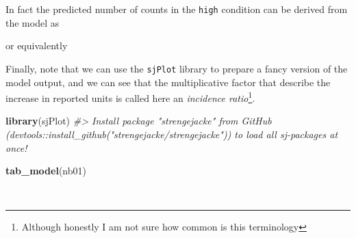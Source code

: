 \documentclass[
]{book}
\newenvironment{Shaded}{\begin{snugshade}}{\end{snugshade}}
\newcommand{\CommentTok}[1]{\textcolor[rgb]{0.56,0.35,0.01}{\textit{#1}}}
\newcommand{\FunctionTok}[1]{\textcolor[rgb]{0.13,0.29,0.53}{\textbf{#1}}}
\newcommand{\NormalTok}[1]{#1}
\newcommand{\SpecialCharTok}[1]{\textcolor[rgb]{0.81,0.36,0.00}{\textbf{#1}}}
\newcommand{\StringTok}[1]{\textcolor[rgb]{0.31,0.60,0.02}{#1}}
\begin{document}
In fact the predicted number of counts in the \texttt{high} condition can be derived from the model as

\begin{Shaded}
\end{Shaded}

or equivalently

\begin{Shaded}
\end{Shaded}

Finally, note that we can use the \texttt{sjPlot} library to prepare a fancy version of the model output, and we can see that the multiplicative factor that describe the increase in reported units is called here an \emph{incidence ratio}\footnote{Although honestly I am not sure how common is this terminology}.

\begin{Shaded}
\begin{Highlighting}[]
\FunctionTok{library}\NormalTok{(sjPlot)}
\CommentTok{\#\textgreater{} Install package "strengejacke" from GitHub (\textasciigrave{}devtools::install\_github("strengejacke/strengejacke")\textasciigrave{}) to load all sj{-}packages at once!}
\end{Highlighting}
\end{Shaded}

\begin{Shaded}
\begin{Highlighting}[]
\FunctionTok{tab\_model}\NormalTok{(nb01)}
\end{Highlighting}
\end{Shaded}

~
\end{document}
